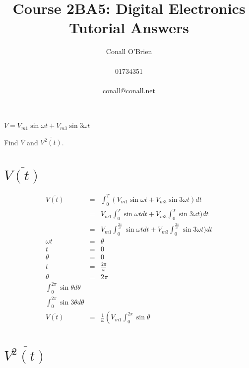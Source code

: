 \documentclass[a4paper,12pt]{article}
\begin{document}
\title{Course 2BA5: Digital Electronics \\ Tutorial Answers}

\author{Conall O'Brien \\ \\ 01734351 \\ \\ conall@conall.net}

\maketitle

\noindent $V = V_{m1} \sin{\omega t} + V_{m3} \sin{3 \omega t}$

\vspace{5mm}

\noindent Find $\overline{V}$ and $\overline{V^{2}(t)}$.

\section{$\overline{V(t)}$}

\begin{eqnarray*}
\overline{V(t)} & = & \int^{T}_{0} (V_{m1} \sin{\omega t} + V_{m3} \sin{3 \omega t}) dt \\
					 & = & V_{m1} \int^{T}_{0} \sin{\omega t} dt + V_{m3} \int^{T}_{0} \sin{3 \omega t}) dt \\
					 & = & V_{m1} \int^{\frac{2 \pi}{\omega}}_{0} \sin{\omega t} dt + V_{m3} \int^{\frac{2 \pi}{\omega}}_{0} \sin{3 \omega t}) dt \\
\omega t			 & = & \theta \\
t 					 & = & 0 \\
\theta			 & = & 0 \\
t					 & = & \frac{2 \pi}{\omega} \\
\theta			 & = & 2 \pi \\
\int^{2 \pi}_{0} \sin{\theta} d\theta & & \\
\int^{2 \pi}_{0} \sin{3 \theta} d\theta & & \\
\overline{V(t)} & = & \frac{1}{\omega} \left( V_{m1} \int^{2 \pi}_{0}
\sin{\theta}
\end{eqnarray*}

\section{$\overline{V^{2}(t)}$}

\begin{eqnarray*}
\end{eqnarray*}
\end{document}

